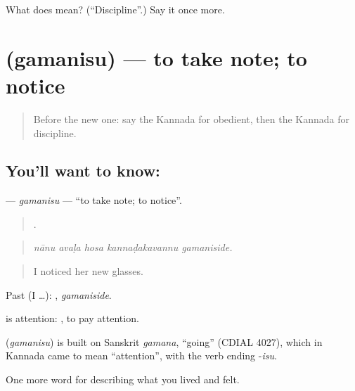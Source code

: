 \begin{tcolorbox}[breakable,colback=teal!4,colframe=teal!35!black,title={Before you move on}]
What does  mean? (\textquotedblleft{}Discipline\textquotedblright{}.) Say it once more.
\end{tcolorbox}
\section[\texorpdfstring{\kn{ಗಮನಿಸು} (gamanisu)}{ಗಮನಿಸು (gamanisu)}]{ (gamanisu) — to take note; to notice}

\label{lesson:KA-C502-gamanisu}



\begin{quote}
Before the new one: say the Kannada for obedient, then the Kannada for discipline.
\end{quote}

\subsection*{You'll want to know: }
\textbf{} — \emph{gamanisu} — \textquotedblleft{}to take note; to notice\textquotedblright{}.

\begin{quote}
    .
\end{quote}

\begin{quote}
\emph{nānu avaḷa hosa kannaḍakavannu gamaniside.}
\end{quote}

\begin{quote}
I noticed her new glasses.
\end{quote}

Past (I …): , \emph{gamaniside}.

 is attention:  , to pay attention.

\begin{cousinweb}
\textbf{} (\emph{gamanisu}) is built on Sanskrit \emph{gamana}, \textquotedblleft{}going\textquotedblright{} (CDIAL 4027), which in Kannada came to mean \textquotedblleft{}attention\textquotedblright{}, with the verb ending -\emph{isu}.
\end{cousinweb}

\begin{grammarlens}[title={What you've built}]
One more word for describing what you lived and felt.
\end{grammarlens}

